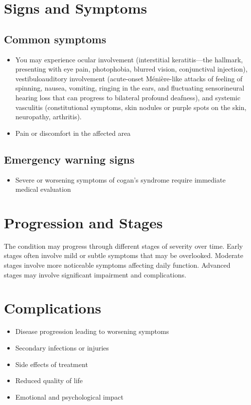 \section{Signs and Symptoms}

\subsection{Common symptoms}
\begin{itemize}[noitemsep]
  \item You may experience ocular involvement (interstitial keratitis---the hallmark, presenting with eye pain, photophobia, blurred vision, conjunctival injection), vestibuloauditory involvement (acute-onset Ménière-like attacks of feeling of spinning, nausea, vomiting, ringing in the ears, and fluctuating sensorineural hearing loss that can progress to bilateral profound deafness), and systemic vasculitis (constitutional symptoms, skin nodules or purple spots on the skin, neuropathy, arthritis).

  \item Pain or discomfort in the affected area
  \end{itemize}

\subsection{Emergency warning signs}
\begin{itemize}[noitemsep]
  \item Severe or worsening symptoms of cogan's syndrome require immediate medical evaluation
\end{itemize}
\section{Progression and Stages}
The condition may progress through different stages of severity over time. Early stages often involve mild or subtle symptoms that may be overlooked. Moderate stages involve more noticeable symptoms affecting daily function. Advanced stages may involve significant impairment and complications.
\section{Complications}
\begin{itemize}[noitemsep]
  \item Disease progression leading to worsening symptoms
  \item Secondary infections or injuries
  \item Side effects of treatment
  \item Reduced quality of life
  \item Emotional and psychological impact
\end{itemize}
